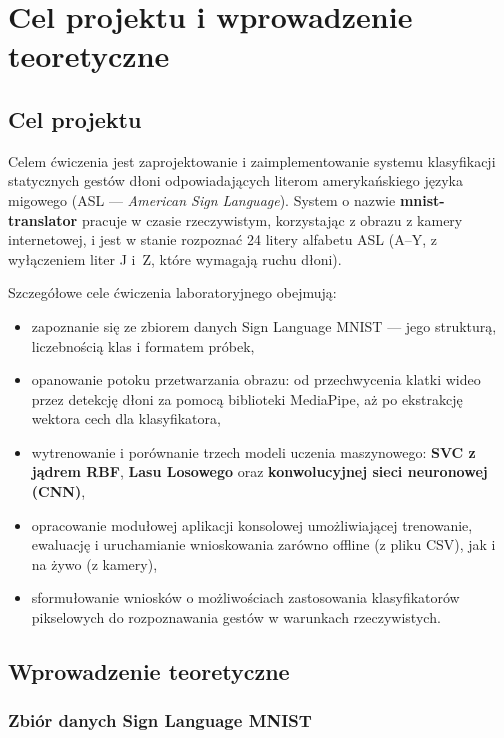 \chapter{Cel projektu i wprowadzenie teoretyczne}
\label{cha:chapter001}

\section{Cel projektu}

Celem ćwiczenia jest zaprojektowanie i zaimplementowanie systemu klasyfikacji
statycznych gestów dłoni odpowiadających literom amerykańskiego języka migowego
(ASL --- \textit{American Sign Language}). System o nazwie \textbf{mnist-translator}
pracuje w czasie rzeczywistym, korzystając z obrazu z kamery internetowej,
i jest w stanie rozpoznać 24 litery alfabetu ASL (A--Y, z wyłączeniem liter J
i~Z, które wymagają ruchu dłoni).

Szczegółowe cele ćwiczenia laboratoryjnego obejmują:

\begin{itemize}
    \item zapoznanie się ze zbiorem danych Sign Language MNIST --- jego strukturą,
          liczebnością klas i formatem próbek,
    \item opanowanie potoku przetwarzania obrazu: od przechwycenia klatki wideo
          przez detekcję dłoni za pomocą biblioteki MediaPipe, aż po ekstrakcję
          wektora cech dla klasyfikatora,
    \item wytrenowanie i porównanie trzech modeli uczenia maszynowego:
          \textbf{SVC z jądrem RBF}, \textbf{Lasu Losowego} oraz
          \textbf{konwolucyjnej sieci neuronowej (CNN)},
    \item opracowanie modułowej aplikacji konsolowej umożliwiającej trenowanie,
          ewaluację i uruchamianie wnioskowania zarówno offline (z pliku CSV),
          jak i na żywo (z kamery),
    \item sformułowanie wniosków o możliwościach zastosowania klasyfikatorów
          pikselowych do rozpoznawania gestów w warunkach rzeczywistych.
\end{itemize}

\section{Wprowadzenie teoretyczne}

\subsection{Zbiór danych Sign Language MNIST}

